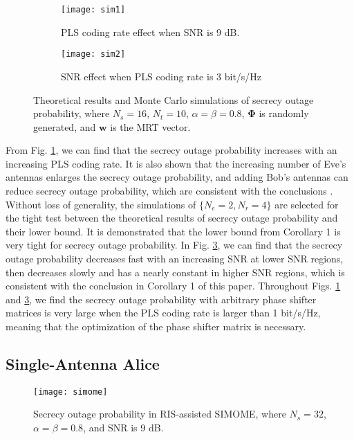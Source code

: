 \documentclass[journal]{IEEEtran}
\theoremstyle{definition}
\begin{document}
\begin{figure}[h!]
\begin{subfigure}[t]{.45\textwidth}
\centering
\texttt{[image: sim1]}
\caption{PLS coding rate effect when SNR is 9 dB.}\label{sim1}
\end{subfigure}\hfill
\begin{subfigure}[t]{.45\textwidth}
\centering
\texttt{[image: sim2]}
\caption{SNR effect when PLS coding rate is 3 bit/s/Hz}\label{sim2}
\end{subfigure}
\caption{Theoretical results and Monte Carlo simulations of secrecy outage probability, where $N_s=16$, $N_t=10$, $\alpha=\beta=0.8$, $\bm{\Phi}$ is randomly generated, and $\mathbf{w}$ is the MRT vector.}
\end{figure}

From Fig. \ref{sim1}, we can find that the secrecy outage probability increases with an increasing PLS coding rate. It is also shown that the increasing number of Eve's antennas enlarges the secrecy outage probability, and adding Bob's antennas can reduce secrecy outage probability, which are consistent with the conclusions \cite{Zhou2011RethinkingSecrecyOutage}. Without loss of generality, the simulations of $\{N_e=2, N_r=4\}$ are selected for the tight test between the theoretical results of secrecy outage probability and their lower bound. It is demonstrated that the lower bound from Corollary 1 is very tight for secrecy outage probability. In Fig. \ref{sim2}, we can find that the secrecy outage probability decreases fast with an increasing SNR at lower SNR regions, then decreases slowly and has a nearly constant in higher SNR regions, which is consistent with the conclusion in Corollary 1 of this paper. Throughout Figs. \ref{sim1} and \ref{sim2}, we find the secrecy outage probability with arbitrary phase shifter matrices is very large when the PLS coding rate is larger than 1 bit/s/Hz, meaning that the optimization of the phase shifter matrix is necessary.

\subsection{Single-Antenna Alice}

\begin{figure}[h]
\centering
\texttt{[image: simome]}
\caption{Secrecy outage probability in RIS-assisted SIMOME, where $N_s=32$, $\alpha=\beta=0.8$, and SNR is 9 dB.}\label{simsimome}
\end{figure}
\end{document}
